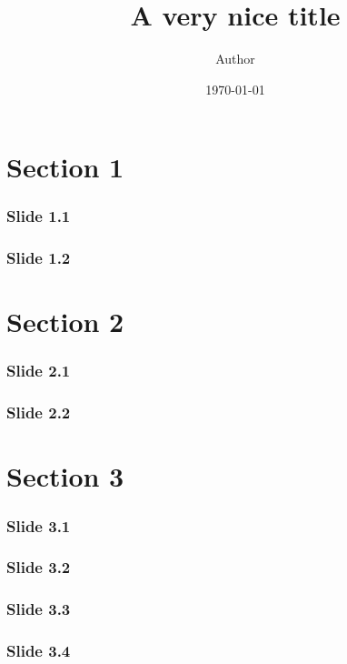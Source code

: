 \documentclass{beamer}
\title{A very nice title}
\author{Author}
\date{\today}
\begin{document}
	\begin{frame}
		\titlepage
	\end{frame}

	\section{Section 1}
		\begin{frame}
			\frametitle{Slide 1.1}
			\blindtext
		\end{frame}
		\begin{frame}
			\frametitle{Slide 1.2}
			\blindtext
		\end{frame}

	\section{Section 2}
		\begin{frame}
			\frametitle{Slide 2.1}
			\blindtext
		\end{frame}
		\begin{frame}
			\frametitle{Slide 2.2}
			\blindtext
		\end{frame}

	\section{Section 3}
		\begin{frame}
			\frametitle{Slide 3.1}
			\blindtext
		\end{frame}
		\begin{frame}
			\frametitle{Slide 3.2}
			\blindtext
		\end{frame}
		\begin{frame}
			\frametitle{Slide 3.3}
			\blindtext
		\end{frame}
		\begin{frame}
			\frametitle{Slide 3.4}
			\blindtext
		\end{frame}
\end{document}
